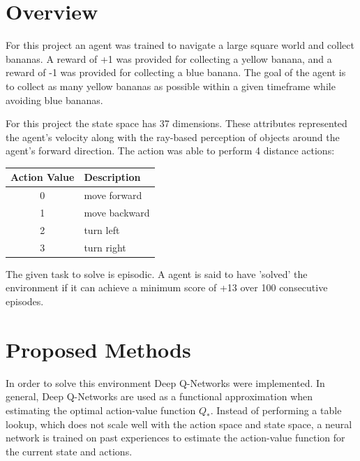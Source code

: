 \documentclass[12pt]{article}
\begin{document}
\maketitle


\section{Overview}
For this project an agent was trained to navigate a large square world and collect bananas.
A reward of +1 was provided for collecting a yellow banana, and a reward of -1 was provided for collecting a blue banana.
The goal of the agent is to collect as many yellow bananas as possible within a given timeframe while avoiding blue bananas.

For this project the state space has 37 dimensions. These attributes represented the agent's velocity along with the ray-based perception
of objects around the agent's forward direction.
The action was able to perform 4 distance actions:

\begin{center}
    \begin{tabular}{|c|l|}
        \hline
        \textbf{Action Value} & \textbf{Description} \\
        \hline
		0 & move forward\\
		1 & move backward\\
        2 & turn left\\
        3 & turn right\\
		\hline
	\end{tabular}
\end{center}

The given task to solve is episodic. 
A agent is said to have 'solved' the environment if it can achieve a minimum score of +13 over 100 consecutive episodes.

\section{Proposed Methods}
\label{methods}
In order to solve this environment Deep Q-Networks \cite{deep_q_networks} were implemented.
In general, Deep Q-Networks are used as a functional approximation when estimating the optimal action-value function $Q_*$.
Instead of performing a table lookup, which does not scale well with the action space and state space, a neural network is trained
on past experiences to estimate the action-value function for the current state and actions.
\end{document}
